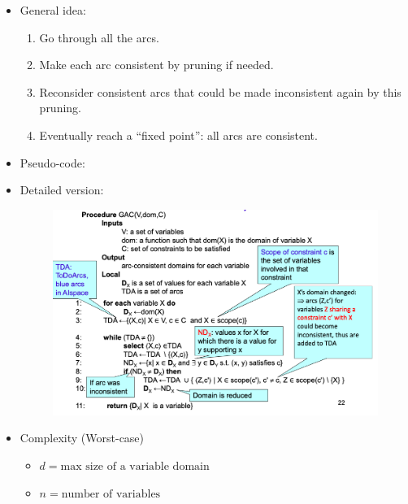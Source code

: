 \documentclass{article}
\begin{document}
\begin{itemize}
    \item General idea:
        \begin{enumerate}
            \item Go through all the arcs.
            \item Make each arc consistent by pruning if needed.
            \item Reconsider consistent arcs that could be made inconsistent again by this pruning.
            \item Eventually reach a ``fixed point'': all arcs are consistent.
        \end{enumerate}
    \item Pseudo-code:
        \begin{algorithmic}
                \EndIf
            \EndWhile
        \end{algorithmic}
    \item Detailed version:
        \begin{figure}[H]
            \includegraphics[width=\textwidth]{gac}
            \centering
        \end{figure}
    \item Complexity (Worst-case)
        \begin{itemize}
            \item $d = \text{max size of a variable domain}$
            \item $n = \text{number of variables}$

\end{itemize}
\end{itemize}
\end{document}
